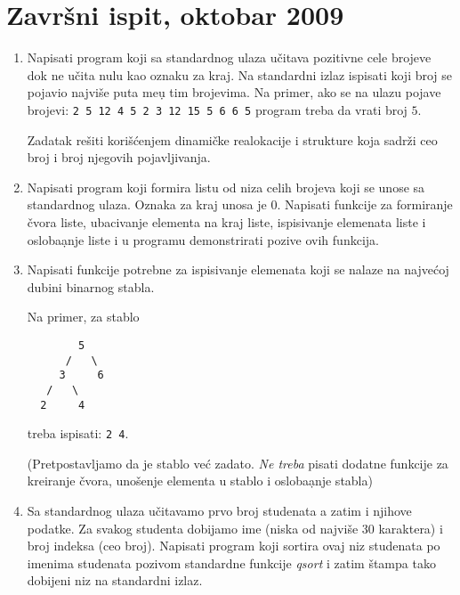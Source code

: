 \section{Zavr\v{s}ni ispit, oktobar 2009}


\begin{enumerate}

\item
Napisati program koji sa standardnog ulaza u\v citava pozitivne cele
brojeve dok ne u\v cita nulu kao oznaku za kraj. Na standardni izlaz
ispisati koji broj se pojavio najvi\v se puta me\d u tim brojevima.
Na primer, ako se na ulazu pojave brojevi:
\verb+2 5 12 4 5 2 3 12 15 5 6 6 5+
program treba da vrati broj $5$.

Zadatak re\v siti kori\v{s}\'cenjem dinami\v cke realokacije i strukture
koja sadr\v zi ceo broj i broj njegovih pojavljivanja.

\item
Napisati program koji formira listu od niza celih brojeva koji se
unose sa standardnog ulaza. Oznaka za kraj unosa je $0$. Napisati funkcije za
formiranje \v cvora liste, ubacivanje elementa na kraj liste,
ispisivanje elemenata liste i osloba\d anje liste i u programu demonstrirati
pozive ovih funkcija.


\item Napisati funkcije potrebne za ispisivanje elemenata koji se nalaze
na najve\' coj dubini binarnog stabla.

Na primer, za stablo

\begin{minipage}[t]{120mm}
\begin{verbatim}
        5
      /   \
     3     6
   /   \
  2     4
\end{verbatim}
\end{minipage}

\noindent
treba ispisati: {\tt 2 4}.

(Pretpostavljamo da je stablo ve\' c zadato. \emph{Ne treba} pisati dodatne
funkcije za kreiranje \v cvora, uno\v senje elementa u stablo i
osloba\d anje stabla)


\item
Sa standardnog ulaza u\v citavamo prvo broj studenata a zatim i
njihove podatke. Za svakog studenta dobijamo ime (niska od najvi\v se
30 karaktera) i broj indeksa (ceo broj). Napisati program koji
sortira ovaj niz studenata po imenima studenata pozivom standardne
funkcije \emph{qsort} i zatim \v stampa tako dobijeni niz na standardni
izlaz.
\end{enumerate}


